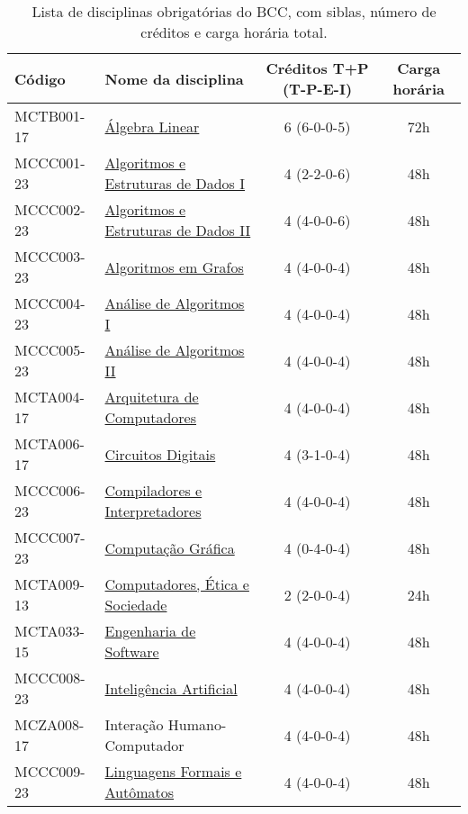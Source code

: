 \begin{table}[h!]
    \caption{Lista de disciplinas obrigatórias do BCC, com siblas, número de créditos e carga horária total.}
    \label{tab:disciplinas_obrigatorias_bcc}

    \centering
    \begin{tabular}{|l|p{}|c|c|}
        \hline
        \textbf{Código} & \textbf{Nome da disciplina} & \textbf{Créditos T+P (T-P-E-I)} & \textbf{Carga horária}\\
        \hline\hline
        MCTB001-17 & \hyperref[disc:alge_lin]{Álgebra Linear} & 6 (6-0-0-5) & 72h \\
        \hline
        MCCC001-23 & \hyperref[disc:aedI]{Algoritmos e Estruturas de Dados I} & 4 (2-2-0-6) & 48h \\
        \hline
        MCCC002-23 & \hyperref[disc:aedII]{Algoritmos e Estruturas de Dados II} & 4 (4-0-0-6) & 48h \\
        \hline
        MCCC003-23 & \hyperref[disc:ag]{Algoritmos em Grafos} & 4 (4-0-0-4) & 48h\\
        \hline
        MCCC004-23 & \hyperref[disc:aaI]{Análise de Algoritmos I} & 4 (4-0-0-4) & 48h \\
        \hline
        MCCC005-23 & \hyperref[disc:aaII]{Análise de Algoritmos II} & 4 (4-0-0-4) & 48h \\
        \hline
        MCTA004-17 & \hyperref[disc:arq]{Arquitetura de Computadores} & 4 (4-0-0-4) & 48h \\
        \hline
        MCTA006-17 & \hyperref[disc:circ_dig]{Circuitos Digitais} & 4 (3-1-0-4) & 48h \\
        \hline
        MCCC006-23 & \hyperref[disc:compi]{Compiladores e Interpretadores} & 4 (4-0-0-4) & 48h \\
        \hline
        MCCC007-23 & \hyperref[disc:cg]{Computação Gráfica} & 4 (0-4-0-4) & 48h  \\
        \hline
        MCTA009-13 & \hyperref[disc:ces]{Computadores, Ética e Sociedade} & 2 (2-0-0-4) & 24h \\
        \hline
        MCTA033-15 & \hyperref[disc:es]{Engenharia de Software} & 4 (4-0-0-4) & 48h \\
        \hline
        MCCC008-23 & \hyperref[disc:ia]{Inteligência Artificial} & 4 (4-0-0-4) & 48h \\
        \hline
        MCZA008-17 & Interação Humano-Computador& 4 (4-0-0-4) & 48h \\
        \hline
        MCCC009-23 & \hyperref[disc:lfa]{Linguagens Formais e Autômatos} & 4 (4-0-0-4) & 48h \\

\end{tabular}
\end{table}
